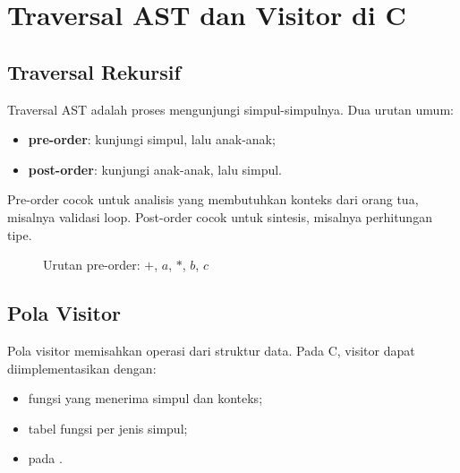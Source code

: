 \section{Traversal AST dan Visitor di C}
\label{sec:ch16-traversal}

\subsection{Traversal Rekursif}

Traversal AST adalah proses mengunjungi simpul-simpulnya. Dua urutan
umum:
\begin{itemize}[leftmargin=*]
  \item \textbf{pre-order}: kunjungi simpul, lalu anak-anak;
  \item \textbf{post-order}: kunjungi anak-anak, lalu simpul.
\end{itemize}

Pre-order cocok untuk analisis yang membutuhkan konteks dari orang
tua, misalnya validasi loop. Post-order cocok untuk sintesis,
misalnya perhitungan tipe.

\begin{figure}[H]
\centering
{}
\caption{Urutan pre-order: \(+\), \(a\), \(*\), \(b\), \(c\)}
\label{fig:ch16-preorder}
\end{figure}

\subsection{Pola Visitor}

Pola visitor memisahkan operasi dari struktur data. Pada C, visitor
dapat diimplementasikan dengan:
\begin{itemize}[leftmargin=*]
  \item fungsi yang menerima simpul dan konteks;
  \item tabel fungsi per jenis simpul;
  \item {} pada .
\end{itemize}

